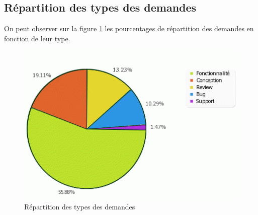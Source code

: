 \subsection{Répartition des types des demandes}
On peut observer sur la figure \ref{fig:pie} les pourcentages de répartition des demandes en fonction de leur type.
\begin{figure}[H!]
  \centering
    \includegraphics[width=15cm]{figures/pie}
  \caption{\label{fig:pie}Répartition des types des demandes}
\end{figure}
